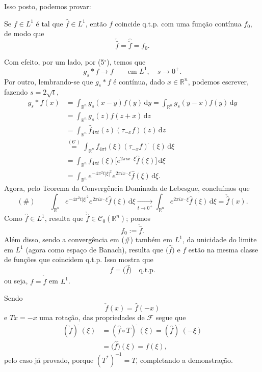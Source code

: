 \documentclass[../distribution_theory_notes.tex]{subfiles}
\begin{document}
Isso posto, podemos provar:

\begin{theorem*}
	Se \(f\in L^{1}\) é tal que \(\hat{f}\in L^{1}\), então \(f\) coincide q.t.p. com uma função contínua \(f_{0}\), de modo que
	\[
		\check{\hat{f}}=\widehat{\check{f}}=f_{0}.
	\]
\end{theorem*}
\begin{proof*}
	Com efeito, por um lado, por (5\(^\circ\)), temos que
	\[
		g_{s}*f\longrightarrow f
		\qquad \text{em }L^{1},\quad s\to 0^{+}.
	\]
	Por outro, lembrando-se que \(g_{s}*f\) é contínua, dado \(x\in \mathbb{R}^{n}\), podemos escrever, fazendo \(s=2\sqrt{t}\),
	\begin{align*}
		g_{s}*f(x)
		 & =\int_{\mathbb{R}^{n}}g_{s}(x-y)f(y)\,\mathrm{d}y
		=\int_{\mathbb{R}^{n}}g_{s}(y-x)f(y)\,\mathrm{d}y                                       \\
		 & =\int_{\mathbb{R}^{n}}g_{s}(z)f(z+x)\,\mathrm{d}z                                    \\
		 & =\int_{\mathbb{R}^{n}}\hat{f}_{4\pi t}(z)(\tau _{-x}f)(z)\,\mathrm{d}z               \\
		 & \overset{(6^{\circ})}{=}
		\int_{\mathbb{R}^{n}}f_{4\pi t}(\xi )(\tau _{-x}f)^{\widehat{\; }}(\xi )\,\mathrm{d}\xi \\
		 & =\int_{\mathbb{R}^{n}}f_{4\pi t}(\xi )
		\bigl[e^{2\pi i x\cdot \xi }\hat{f}(\xi )\bigr] \,\mathrm{d}\xi                         \\
		 & =\int_{\mathbb{R}^{n}}e^{-4\pi ^{2}t|\xi |^{2}}
		e^{2\pi i x\cdot \xi }\hat{f}(\xi )\,\mathrm{d}\xi .
	\end{align*}
	Agora, pelo Teorema da Convergência Dominada de Lebesgue, concluímos que
	\[
		(\#)\qquad
		\int_{\mathbb{R}^{n}}e^{-4\pi ^{2}t|\xi |^{2}}
		e^{2\pi i x\cdot \xi }\hat{f}(\xi )\,\mathrm{d}\xi
		\underset{t\to 0^{+}}{\longrightarrow}
		\int_{\mathbb{R}^{n}}e^{2\pi i x\cdot \xi }\hat{f}(\xi )\,\mathrm{d}\xi
		=\check{\hat{f}}(x).
	\]
	Como \(\hat{f}\in L^{1}\), resulta que \(\check{\hat{f}}\in \mathcal{C}_{0}(\mathbb{R}^{n})\); pomos
	\[
		f_{0}:=\check{\hat{f}}.
	\]
	Além disso, sendo a convergência em (\(\#\)) também em \(L^{1}\), da unicidade do limite em \(L^{1}\) (agora como espaço de Banach), resulta que \((\hat{f}\check{)}\) e \(f\) estão na mesma classe de funções que coincidem q.t.p. Isso mostra que
	\[
		f=(\hat{f}\check{)}\quad \text{q.t.p.}
	\]
	ou seja, \(f=\check{\hat{f}}\) em \(L^{1}\).

	Sendo
	\[
		\check{f}(x)=\hat{f}(-x)
	\]
	e \(Tx=-x\) uma rotação, das propriedades de \(\mathcal{F}\) segue que
	\begin{align*}
		(\check{f})^{\hat{\; }}(\xi )
		 & =(\hat{f}\circ T)^{\hat{\; }}(\xi )
		=(\hat{f})^{\hat{\; }}(-\xi )          \\
		 & =(\hat{f}\check{)}(\xi )
		=f(\xi ),
	\end{align*}
	pelo caso já provado, porque \((T^{*})^{-1}=T\), completando a demonstração. \qedsymbol
\end{proof*}
\end{document}
